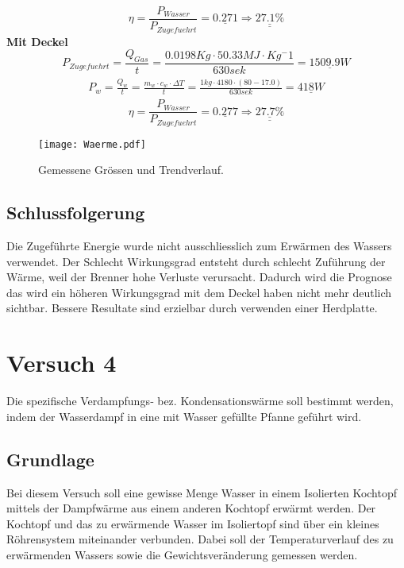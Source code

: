 \documentclass{article}
\begin{document}
\begin{equation}
\eta = \frac{P_{Wasser}}{P_{Zugefuehrt}} = \underline{0.271}\Rightarrow \underline{\underline{27.1\%}}
\end{equation}
\textbf{Mit Deckel}
\begin{equation}
P_{Zugefuehrt} = \frac{Q_{Gas}}{t} = \frac{0.0198Kg\cdot 50.33MJ \cdot Kg^-1}{630sek} = \underline{1509.9 W }
\end{equation}
\begin{align}
\begin{split}
P_{w} = \frac{Q_w}{t} = \frac{m_{w} \cdot c_{w} \cdot \Delta T}{t}=  \frac{1kg \cdot 4180 \cdot (80-17.0)}{630sek} = \underline{418W}
\end{split}
\end{align}
\begin{equation}
\eta = \frac{P_{Wasser}}{P_{Zugefuehrt}} = \underline{0.277}\Rightarrow \underline{\underline{27.7\%}}
\end{equation}
\begin{figure}[H]
\texttt{[image: Waerme.pdf]} 
\caption{Gemessene Grössen und Trendverlauf.}
\end{figure}


\subsection{Schlussfolgerung}
Die Zugeführte Energie wurde nicht ausschliesslich zum Erwärmen des Wassers verwendet. Der Schlecht Wirkungsgrad entsteht durch schlecht Zuführung der Wärme, weil der Brenner hohe Verluste verursacht. Dadurch wird die Prognose das wird ein höheren Wirkungsgrad mit dem Deckel haben nicht mehr deutlich sichtbar. Bessere Resultate sind erzielbar durch verwenden einer Herdplatte.
\section{Versuch 4}
Die spezifische Verdampfungs‐ bez. Kondensationswärme soll bestimmt werden, indem der Wasserdampf in eine
mit Wasser gefüllte Pfanne geführt wird.
\subsection{Grundlage}
Bei diesem Versuch soll eine gewisse Menge Wasser in einem Isolierten Kochtopf mittels der 
Dampfwärme aus einem anderen Kochtopf erwärmt werden. Der Kochtopf und das zu erwärmende 
Wasser im Isoliertopf sind über ein kleines Röhrensystem miteinander verbunden. Dabei soll der 
Temperaturverlauf des zu erwärmenden Wassers sowie die Gewichtsveränderung gemessen werden. 
\end{document}
